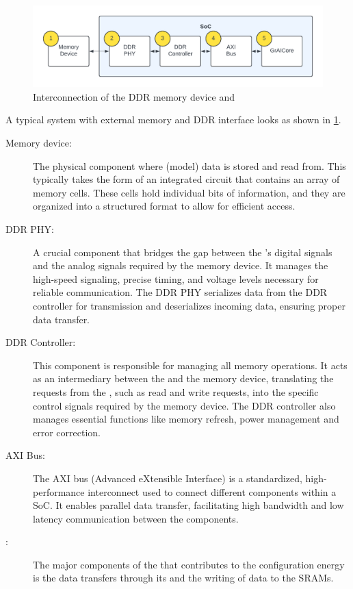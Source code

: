 \begin{figure}[hbtp]
    \centering
    \includegraphics[width=\linewidth]{assets/ddr_graicore_block_diagram.pdf}
    \caption{
        Interconnection of the DDR memory device and \graicore{}
    }
    \label{fig:ddr_graicore_block_diagram}
\end{figure}

A typical system with external memory and DDR interface looks as shown in \cref{fig:ddr_graicore_block_diagram}.
\begin{description}
    \item[Memory device:] 
    The physical component where (model) data is stored and read from.
    This typically takes the form of an integrated circuit that contains an array of memory cells.
    These cells hold individual bits of information, and they are organized into a structured format to allow for efficient access.
    \item[DDR PHY:] 
    A crucial component that bridges the gap between the \graicore{}'s digital signals and the analog signals required by the memory device.
    It manages the high-speed signaling, precise timing, and voltage levels necessary for reliable communication.
    The DDR PHY serializes data from the DDR controller for transmission and deserializes incoming data, ensuring proper data transfer.
    \item[DDR Controller:] 
    This component is responsible for managing all memory operations.
    It acts as an intermediary between the \graicore{} and the memory device, translating the requests from the \graicore{}, such as read and write requests, into the specific control signals required by the memory device.
    The DDR controller also manages essential functions like memory refresh, power management and error correction.
    \item[AXI Bus:] 
    The AXI bus (Advanced eXtensible Interface) is a standardized, high-performance interconnect used to connect different components within a SoC.
    It enables parallel data transfer, facilitating high bandwidth and low latency communication between the components.
    \item[\graicore{}:] 
    The major components of the \graicore{} that contributes to the configuration energy is the data transfers through its \confignoc{} and the writing of data to the SRAMs.
\end{description}

